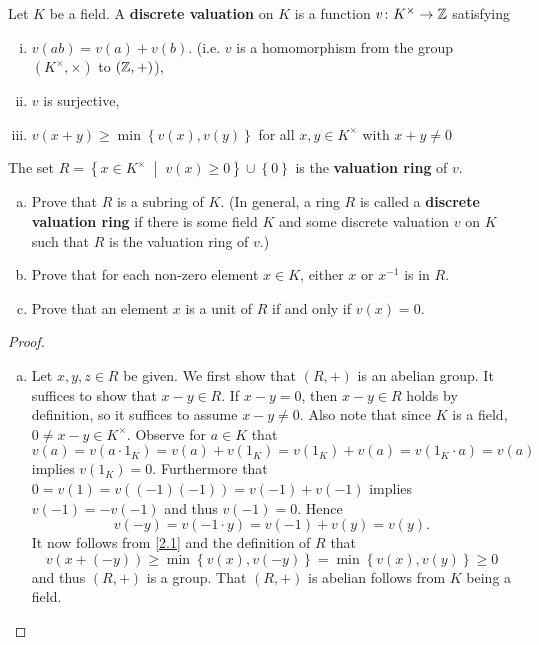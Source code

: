 \documentclass[10pt]{amsart}
\begin{document}
\begin{thm}
  Let $K$ be a field.
  A {\bf discrete valuation} on $K$ is a function $v \colon K^\times \rightarrow \mathbb{Z}$ satisfying
  \begin{enumerate}[(i)]
  \item
    $v(ab) = v(a) + v(b)$.
    (i.e. $v$ is a homomorphism from the group $(K^\times, \times)$ to $(\mathbb{Z}, +)$),
  \item
    $v$ is surjective,
  \item
    $v(x + y) \geq \min \left\{v(x), v(y)\right\}$ for all $x,y \in K^\times$ with $x + y \neq 0$
  \end{enumerate}
  The set $R = \left\{x \in K^\times \;\middle\vert\; v(x) \geq 0\right\} \cup \left\{0\right\}$ is the {\bf valuation ring} of $v$.
  \begin{enumerate}[(a)]
  \item
    Prove that $R$ is a subring of $K$. (In general, a ring $R$ is called a {\bf discrete valuation ring} if there is some field $K$ and some discrete valuation $v$ on $K$ such that $R$ is the valuation ring of $v$.)
  \item
    Prove that for each non-zero element $x \in K$, either $x$ or $x^{-1}$ is in $R$.
  \item
    Prove that an element $x$ is a unit of $R$ if and only if $v(x) = 0$.
  \end{enumerate}
  \begin{proof}
    \begin{enumerate}[(a)]
    \item
      Let $x,y,z \in R$ be given.
      We first show that $(R, +)$ is an abelian group.
      It suffices to show that $x - y \in R$.
      If $x - y = 0$, then $x - y \in R$ holds by definition, so it suffices to assume $x - y \neq 0$.
      Also note that since $K$ is a field, $0 \neq x - y \in K^\times$.
      Observe for $a \in K$ that 
      $$v(a) = v(a \cdot 1_K) = v(a) + v(1_K) = v(1_K) + v(a)  = v(1_K \cdot a) = v(a)$$ 
      implies $v(1_K) = 0$.
      Furthermore that $0 = v(1) = v((-1)(-1)) = v(-1) + v(-1)$ implies $v(-1) = -v(-1)$ and thus $v(-1) = 0$.
      Hence
      \begin{equation}\label{2.1}
        v(-y) = v(-1 \cdot y) = v(-1) + v(y) = v(y).
      \end{equation}
      It now follows from \eqref{2.1} and the definition of $R$ that
      $$v(x + (-y)) \geq \min\left\{v(x), v(-y)\right\} = \min\left\{v(x), v(y)\right\} \geq 0$$
      and thus $(R, +)$ is a group.
      That $(R, +)$ is abelian follows from $K$ being a field.
      

\end{enumerate}
\end{proof}
\end{thm}
\end{document}
